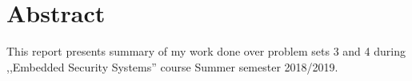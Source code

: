\documentclass[12pt]{article}
\begin{document}


\section{Abstract}

This report presents summary of my work done over problem sets 3 and 4
during ,,Embedded Security Systems'' course Summer semester 2018/2019.



\end{document}
